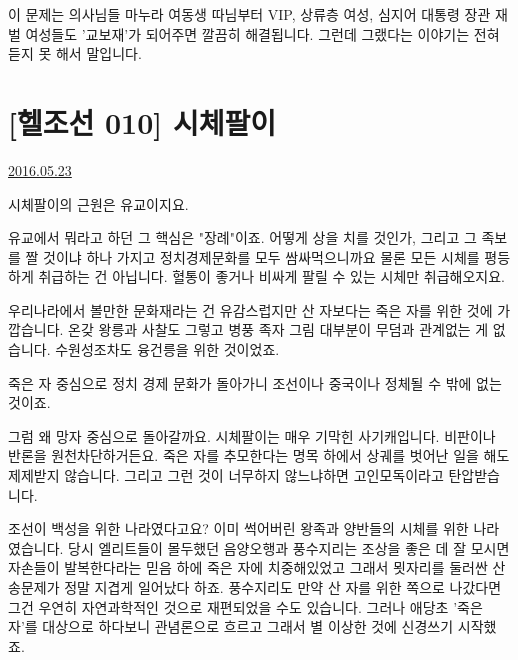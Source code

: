 이 문제는 의사님들 마누라 여동생 따님부터 VIP, 상류층 여성, 심지어 대통령 장관 재벌 여성들도 '교보재'가 되어주면 깔끔히 해결됩니다.
그런데 그랬다는 이야기는 전혀 듣지 못 해서 말입니다.
\vspace{5mm}








\section{[헬조선 010] 시체팔이}
\href{https://www.kockoc.com/Apoc/789064}{2016.05.23}

\vspace{5mm}

시체팔이의 근원은 유교이지요.
\vspace{5mm}

유교에서 뭐라고 하던 그 핵심은 "장례"이죠.
어떻게 상을 치를 것인가, 그리고 그 족보를 짤 것이냐 하나 가지고 정치경제문화를 모두 쌈싸먹으니까요
물론 모든 시체를 평등하게 취급하는 건 아닙니다. 혈통이 좋거나 비싸게 팔릴 수 있는 시체만 취급해오지요.
\vspace{5mm}

우리나라에서 볼만한 문화재라는 건 유감스럽지만 산 자보다는 죽은 자를 위한 것에 가깝습니다.
온갖 왕릉과 사찰도 그렇고 병풍 족자 그림 대부분이 무덤과 관계없는 게 없습니다.
수원성조차도 융건릉을 위한 것이었죠.
\vspace{5mm}

죽은 자 중심으로 정치 경제 문화가 돌아가니 조선이나 중국이나 정체될 수 밖에 없는 것이죠.
\vspace{5mm}

그럼 왜 망자 중심으로 돌아갈까요.
시체팔이는 매우 기막힌 사기캐입니다. 비판이나 반론을 원천차단하거든요.
죽은 자를 추모한다는 명목 하에서 상궤를 벗어난 일을 해도 제제받지 않습니다.
그리고 그런 것이 너무하지 않느냐하면 고인모독이라고 탄압받습니다.
\vspace{5mm}

조선이 백성을 위한 나라였다고요? 이미 썩어버린 왕족과 양반들의 시체를 위한 나라였습니다.
당시 엘리트들이 몰두했던 음양오행과 풍수지리는 조상을 좋은 데 잘 모시면 자손들이 발복한다라는 믿음 하에 죽은 자에 치중해있었고
그래서 묏자리를 둘러싼 산송문제가 정말 지겹게 일어났다 하죠.
풍수지리도 만약 산 자를 위한 쪽으로 나갔다면 그건 우연히 자연과학적인 것으로 재편되었을 수도 있습니다.
그러나 애당초 '죽은 자'를 대상으로 하다보니 관념론으로 흐르고 그래서 별 이상한 것에 신경쓰기 시작했죠.
\vspace{5mm}

